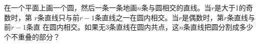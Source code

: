在一个平面上画一个圆，然后一条一条地画$n$条与圆相交的直线。当$r$是大于1的奇数时，第
$r$条直线只与前$r-1$条直线之一在圆内相交。当$r$是偶数时，第$r$条直线与前$r-1$条直
在圆内相交。如果无3条直线在圆内共点，这$n$条直线把圆分割成多少个不重叠的部分？